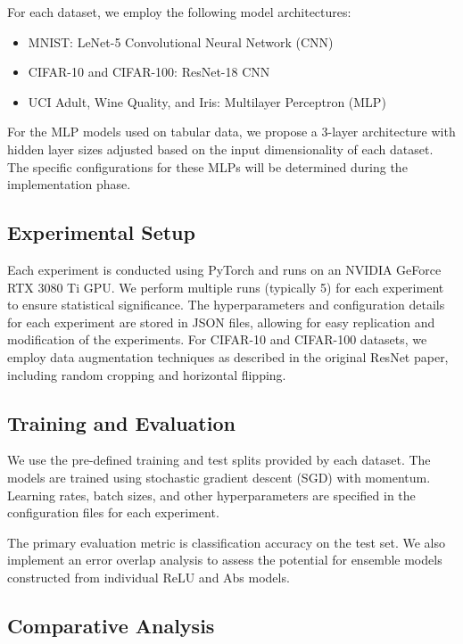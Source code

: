 \documentclass[11pt]{article}
\begin{document}
For each dataset, we employ the following model architectures:

\begin{itemize}
\item MNIST: LeNet-5 Convolutional Neural Network (CNN)
\item CIFAR-10 and CIFAR-100: ResNet-18 CNN
\item UCI Adult, Wine Quality, and Iris: Multilayer Perceptron (MLP)
\end{itemize}

For the MLP models used on tabular data, we propose a 3-layer architecture with hidden layer sizes adjusted based on the input dimensionality of each dataset. The specific configurations for these MLPs will be determined during the implementation phase.

\subsection{Experimental Setup}

Each experiment is conducted using PyTorch and runs on an NVIDIA GeForce RTX 3080 Ti GPU. We perform multiple runs (typically 5) for each experiment to ensure statistical significance. The hyperparameters and configuration details for each experiment are stored in JSON files, allowing for easy replication and modification of the experiments.
For CIFAR-10 and CIFAR-100 datasets, we employ data augmentation techniques as described in the original ResNet paper, including random cropping and horizontal flipping.

\subsection{Training and Evaluation}

We use the pre-defined training and test splits provided by each dataset. The models are trained using stochastic gradient descent (SGD) with momentum. Learning rates, batch sizes, and other hyperparameters are specified in the configuration files for each experiment.

The primary evaluation metric is classification accuracy on the test set. We also implement an error overlap analysis to assess the potential for ensemble models constructed from individual ReLU and Abs models.

\subsection{Comparative Analysis}
\end{document}
